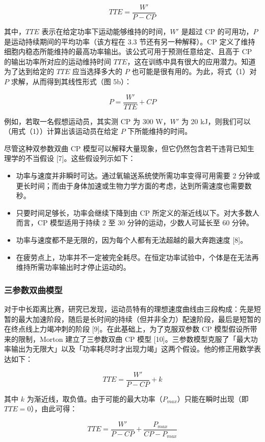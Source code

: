 \documentclass[11pt,a4paper]{ctexart}
\begin{document}
\[
TTE=\frac{W'}{P-CP}
\]

其中，$TTE$ 表示在给定功率下运动能够维持的时间，$W'$ 是超过 CP 的可用功，$P$ 是运动持续期间的平均功率（该方程在 3.3 节还有另一种解释）。CP 定义了维持细胞内稳态所能维持的最高功率输出。该公式可用于预测任意给定、且高于 CP 的输出功率所对应的运动维持时间 $TTE$，这在训练中具有很大的应用潜力。知道为了达到给定的 $TTE$ 应当选择多大的 $P$ 也可能是很有用的。为此，将式（1）对 $P$ 求解，从而得到其线性形式（图 5b）：

\[
P=\frac{W'}{TTE}+CP
\]

例如，若取一名假想运动员，其实测 CP 为 300 W，$W'$ 为 20 kJ，则我们可以（用式（1））计算出该运动员在给定 $P$ 下所能维持的时间。

尽管这种双参数双曲 CP 模型可以解释大量现象，但它仍然包含若干违背已知生理学的不当假设 [7]。这些假设列示如下：

\begin{itemize}
\item 功率与速度并非瞬时可达。通过氧输送系统使所需功率变得可用需要 2 分钟或更长时间；而由于身体加速或生物力学方面的考虑，达到所需速度也需要数秒。
\item 只要时间足够长，功率会继续下降到由 CP 所定义的渐近线以下。对大多数人而言，CP 模型适用于持续 2 至 30 分钟的运动，少数人可延长至 60 分钟。
\item 功率与速度都不是无限的，因为每个人都有无法超越的最大奔跑速度 [8]。
\item 在疲劳点上，功率并不一定被完全耗尽。在恒定功率试验中，个体是在无法再维持所需功率输出时才停止运动的。
\end{itemize}

\subsubsection{三参数双曲模型}

对于中长距离比赛，研究已发现，运动员特有的理想速度曲线由三段构成：先是短暂的最大加速阶段，随后是长时间的持续（但并非全力）配速阶段，最后是短暂的在终点线上力竭冲刺的阶段 [9]。在此基础上，为了克服双参数 CP 模型假设所带来的限制，Morton 建立了三参数双曲 CP 模型 [10]。三参数模型克服了「最大功率输出为无限大」以及「功率耗尽时才出现力竭」这两个假设。他的修正用数学表达如下：

\[
TTE=\frac{W'}{P-CP}+k
\]

其中 $k$ 为渐近线，取负值。由于可能的最大功率（$P_{max}$）只能在瞬时出现（即 $TTE=0$），由此可得：

\[
TTE=\frac{W'}{P-CP}+\frac{P_{max}}{CP-P_{max}}
\]
\end{document}
